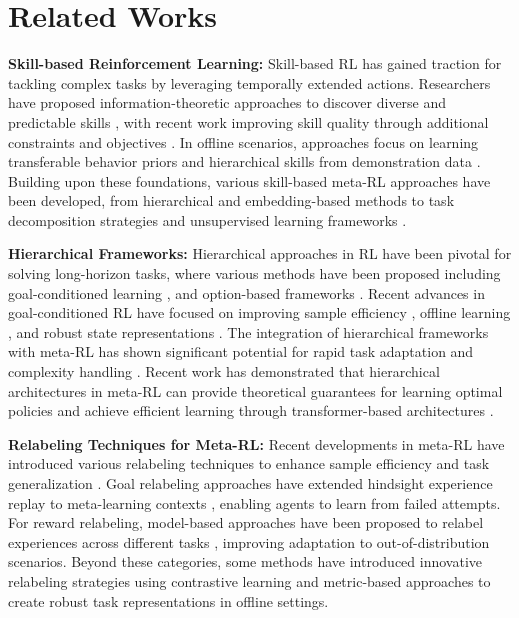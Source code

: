 \section{Related Works}
\label{sec:related}
\textbf{Skill-based Reinforcement Learning: }Skill-based RL has gained traction for tackling complex tasks by leveraging temporally extended actions. Researchers have proposed information-theoretic approaches to discover diverse and predictable skills \cite{gregor2016variational, eysenbachdiversity, achiam2018variational, sharmadynamics}, with recent work improving skill quality through additional constraints and objectives \cite{strouselearning, park2022lipschitz, park2023controllability, hudisentangled}. In offline scenarios, approaches focus on learning transferable behavior priors and hierarchical skills from demonstration data \cite{pertsch2021accelerating, pertsch2022guided, xu2022aspire, shi2023skill}. Building upon these foundations, various skill-based meta-RL approaches have been developed, from hierarchical and embedding-based methods \cite{nam2022simpl, chien2023variational, cho2024hierarchical} to task decomposition strategies \cite{yoo2022skills, he2024decoupling} and unsupervised learning frameworks \cite{gupta2018unsupervised, jabri2019unsupervised, shin2024semtra}.


\textbf{Hierarchical Frameworks: }Hierarchical approaches in RL have been pivotal for solving long-horizon tasks, where various methods have been proposed including goal-conditioned learning \cite{levy2019learning, li2019hierarchical, gehring2021hierarchical}, and option-based frameworks \cite{bacon2017option, riemer2018learning, barreto2019option, araki2021logical}. Recent advances in goal-conditioned RL have focused on improving sample efficiency \cite{robert2024sample}, offline learning \cite{park2024hiql}, and robust state representations \cite{yin2024representation}. The integration of hierarchical frameworks with meta-RL has shown significant potential for rapid task adaptation and complexity handling \cite{frans2018meta, fu2020mghrl, fu2023meta}. Recent work has demonstrated that hierarchical architectures in meta-RL can provide theoretical guarantees for learning optimal policies \cite{chua2023provable} and achieve efficient learning through transformer-based architectures \cite{shala2024hierarchical}.


\textbf{Relabeling Techniques for Meta-RL: }Recent developments in meta-RL have introduced various relabeling techniques to enhance sample efficiency and task generalization \cite{pong2022offline, jiang2023doubly}. Goal relabeling approaches have extended hindsight experience replay to meta-learning contexts \cite{packer2021hindsight, wanhindsight}, enabling agents to learn from failed attempts. For reward relabeling, model-based approaches have been proposed to relabel experiences across different tasks \cite{mendonca2020meta}, improving adaptation to out-of-distribution scenarios. Beyond these categories, some methods have introduced innovative relabeling strategies using contrastive learning \cite{yuan2022robust, zhou2024generalizable} and metric-based approaches \cite{li2020multi} to create robust task representations in offline settings.
